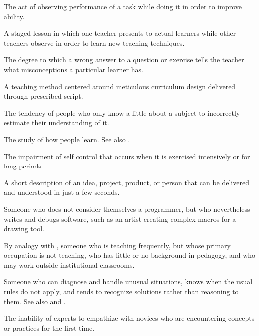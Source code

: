 \begin{description}
 The act of observing
performance of a task while doing it in order to improve ability.

 A staged lesson in which
one teacher presents to actual learners while other teachers observe in order to
learn new teaching techniques.

 The degree to which a wrong answer
to a question or exercise tells the teacher what misconceptions a particular
learner has.

 A teaching method centered
around meticulous curriculum design delivered through prescribed script.

 The tendency of people
who only know a little about a subject to incorrectly estimate their
understanding of it.

 The study of how
people learn. See also .

 The impairment of self control that
occurs when it is exercised intensively or for long periods.

 A short description of an idea,
project, product, or person that can be delivered and understood in just a few
seconds.

 Someone who does not
consider themselves a programmer, but who nevertheless writes and debugs
software, such as an artist creating complex macros for a drawing tool.

 By analogy with
,
someone who is teaching frequently, but whose primary occupation is not
teaching, who has little or no background in pedagogy, and who may work outside
institutional classrooms.

 Someone who can diagnose and handle unusual
situations, knows when the usual rules do not apply, and tends to recognize
solutions rather than reasoning to them. See
also 
and .

 The inability of experts to
empathize with novices who are encountering concepts or practices for the first
time.


\end{description}
